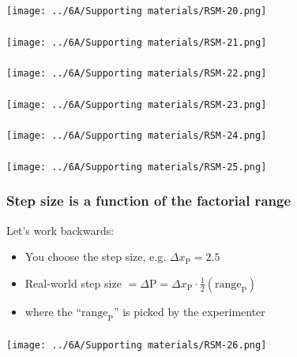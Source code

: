 \begin{frame}\frametitle{}
	\centerline{\texttt{[image: ../6A/Supporting materials/RSM-20.png]}}
\end{frame}
\begin{frame}\frametitle{}
	\centerline{\texttt{[image: ../6A/Supporting materials/RSM-21.png]}}
\end{frame}
\begin{frame}\frametitle{}
	\centerline{\texttt{[image: ../6A/Supporting materials/RSM-22.png]}}
\end{frame}
\begin{frame}\frametitle{}
	\centerline{\texttt{[image: ../6A/Supporting materials/RSM-23.png]}}
\end{frame}
\begin{frame}\frametitle{}
	\centerline{\texttt{[image: ../6A/Supporting materials/RSM-24.png]}}
\end{frame}
\begin{frame}\frametitle{}
	\centerline{\texttt{[image: ../6A/Supporting materials/RSM-25.png]}}
\end{frame}

\begin{frame}\frametitle{Step size is a function of the factorial range}
	Let's work backwards:\vspace{1cm}
	\begin{itemize}
		\item	You choose the step size, e.g. $\Delta x_\text{P} = 2.5$
		\vspace{0.5cm}
		\item	Real-world step size $= \Delta \text{P} = \Delta x_\text{P} \cdot \tfrac{1}{2}\left(\text{range}_\text{P} \right) $
		\vspace{0.5cm}
		\item	where the ``$\text{range}_\text{P}$'' is picked by the experimenter 
	\end{itemize}
\end{frame}

\begin{frame}\frametitle{}
	\centerline{\texttt{[image: ../6A/Supporting materials/RSM-26.png]}}
\end{frame}

